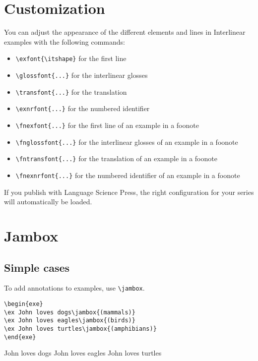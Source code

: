 \documentclass[output=paper]{langscibook}
\newcommand{\cmd}[1]{\texttt{\textbackslash#1}}
\begin{document}
\section{Customization}
You can adjust the appearance of the different elements and lines in Interlinear examples with the following commands:
\begin{itemize}
\item  \cmd{exfont\{\textbackslash itshape\}} for the first line
\item  \cmd{glossfont\{...\}} for the interlinear glosses 
\item  \cmd{transfont\{...\}} for the translation 
\item  \cmd{exnrfont\{...\}} for the numbered identifier
\medskip 
\item  \cmd{fnexfont\{...\}} for the first line of an example in a foonote
\item  \cmd{fnglossfont\{...\}} for the interlinear glosses of an example in a foonote
\item  \cmd{fntransfont\{...\}} for the translation of an example in a foonote
\item  \cmd{fnexnrfont\{...\}} for the numbered identifier of an example in a foonote
\end{itemize}
    
If you publish with Language Science Press, the right configuration for your series will automatically be loaded.

 
\section{Jambox}
\subsection{Simple cases}
To add annotations to examples, use \cmd{jambox}.


\begin{lstlisting}
\begin{exe}
\ex John loves dogs\jambox{(mammals)}
\ex John loves eagles\jambox{(birds)}
\ex John loves turtles\jambox{(amphibians)}   
\end{exe}
 \end{lstlisting}
 
\begin{exe}
\ex John loves dogs
\ex John loves eagles
\ex John loves turtles   
\end{exe}  
\end{document}
